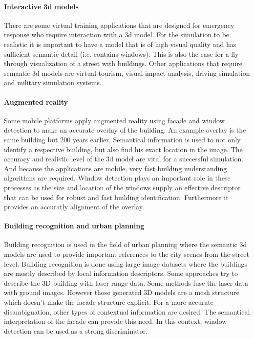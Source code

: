 \paragraph{Interactive 3d models}
	There are some virtual training applications that are designed for
	emergency response who require interaction with a 3d model.  
	For the simulation to be realistic it is important to have a model that is
	of high visual quality and has sufficient semantic detail (i.e. contains
	windows).  This is also the case for a fly-through visualization of a street with
	buildings.
	Other applications that require semantic 3d models are virtual tourism,
	visual impact analysis, driving simulation and military simulation systems.

\paragraph{Augmented reality}
	Some mobile platforms apply augmented reality using facade and window
	detection to make an accurate overlay of the building. An example overlay is the
	same building but 200 years earlier.  Semantical information is used to not
	only identify a respective building, but also find his exact location in the
	image.  The accuracy and realistic level of the 3d model are vital for a
	successful simulation.  And because the applications are mobile, very fast
	building understanding algorithms are required.  
	Window detection plays an
	important role in these processes as the size and location of the windows
	supply an effective descriptor that can be used for robust and fast building
	identification.  Furthermore it provides an accuratly alignment of the
	overlay.

\paragraph{Building recognition and urban planning}
	Building recognition is used in the field of urban planning where the semantic 3d
	models are used to provide important references to the city scenes from the
	street level.
	Building recognition is done using large image datasets where the
	buildings are mostly described by local information descriptors.  
	Some approaches try to describe the 3D building with laser range data. Some methods fuse the laser data with
	ground images. However those generated 3D models are a mesh structure which doesn't make the facade structure explicit.
	For a more accurate disambiguation, other types of contextual information are
	desired.  The semantical interpretation of the facade can provide this need.
	In this context, window detection can be used as a strong discriminator.\\

